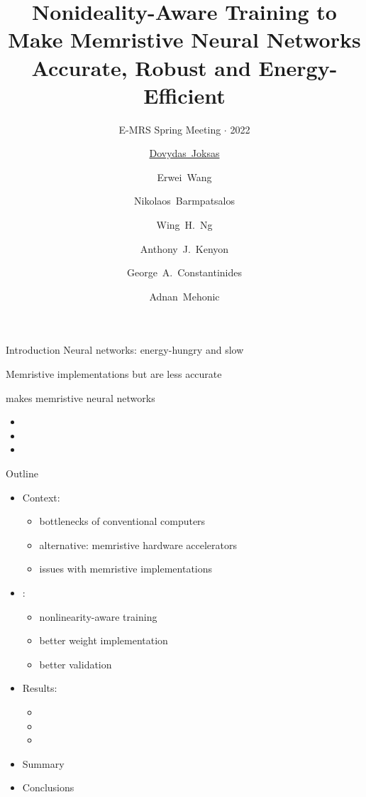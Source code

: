 \documentclass[
  aspectratio=169,
  hyperref={breaklinks=true, colorlinks, citecolor=blue, linkcolor=blue, urlcolor=blue},
]{beamer}
\title{Nonideality-Aware Training to Make Memristive Neural Networks Accurate, Robust and Energy-Efficient}
\subtitle{E-MRS Spring Meeting $\cdot$ 2022}
\date{}
\author{%
  \underline{Dovydas~Joksas}
  \and
  Erwei~Wang
  \and
  Nikolaos~Barmpatsalos
  \and
  Wing~H.~Ng
  \and
  Anthony~J.~Kenyon
  \and
  George~A.~Constantinides
  \and
  Adnan~Mehonic
}
\begin{document}
\maketitle

\begin{frame}{Introduction}
  \pause{}
  Neural networks: \alert{energy-hungry} and \alert{slow}

  \pause{}
  \bigskip

  Memristive implementations  but are \alert{less accurate}

  \pause{}
  \bigskip

   makes memristive neural networks
  \pause{}
  \begin{itemize}[<+->]
    \item {}
    \item {}
    \item {}
  \end{itemize}
\end{frame}

\begin{frame}{Outline}
  \pause{}

  \begin{itemize}[<+->]
    \item Context:
      \begin{itemize}
        \item bottlenecks of conventional computers
        \item alternative: memristive hardware accelerators
        \item \alert{issues with memristive implementations}
      \end{itemize}
    \item {}:
      \begin{itemize}
        \item nonlinearity-aware training
        \item better weight implementation
        \item better validation
      \end{itemize}
    \item Results:
      \begin{itemize}
        \item {}
        \item {}
        \item {}
      \end{itemize}
    \item Summary
    \item Conclusions
  \end{itemize}

\end{frame}
\end{document}
